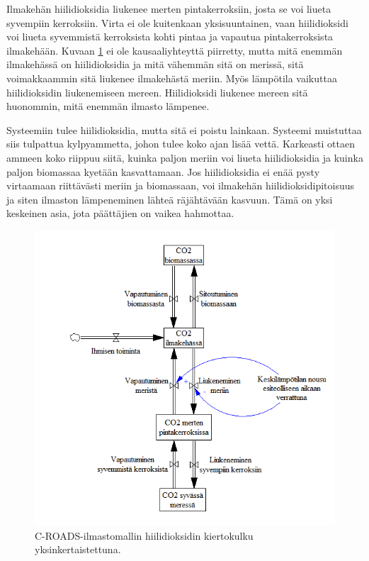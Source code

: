 \documentclass[finnish,12pt,a4paper,pdftex]{article}
\begin{document}
\begin{onehalfspacing}
Ilmakehän hiilidioksidia liukenee merten pintakerroksiin, josta se voi liueta syvempiin kerroksiin. Virta ei ole kuitenkaan yksisuuntainen, vaan hiilidioksidi voi liueta syvemmistä kerroksista kohti pintaa ja vapautua pintakerroksista ilmakehään. Kuvaan \ref{ilmasto:co2} ei ole kausaaliyhteyttä piirretty, mutta mitä enemmän ilmakehässä on hiilidioksidia ja mitä vähemmän sitä on merissä, sitä voimakkaammin sitä liukenee ilmakehästä meriin. Myös lämpötila vaikuttaa hiilidioksidin liukenemiseen mereen. Hiilidioksidi liukenee mereen sitä huonommin, mitä enemmän ilmasto lämpenee.  \cite{Croads, CroadsFlightSimulator2011}

Systeemiin tulee hiilidioksidia, mutta sitä ei poistu lainkaan. Systeemi muistuttaa siis tulpattua kylpyammetta, johon tulee koko ajan lisää vettä. Karkeasti ottaen ammeen koko riippuu siitä, kuinka paljon meriin voi liueta hiilidioksidia ja kuinka paljon biomassaa kyetään kasvattamaan. Jos hiilidioksidia ei enää pysty virtaamaan riittävästi meriin ja biomassaan, voi ilmakehän hiilidioksidipitoisuus ja siten ilmaston lämpeneminen lähteä räjähtävään kasvuun. Tämä on yksi keskeinen asia, jota päättäjien on vaikea hahmottaa. \cite{CroadsFlightSimulator2011}

\begin{figure}[H]
\centering \includegraphics{c-roads-co2}
\caption{C-ROADS-ilmastomallin hiilidioksidin kiertokulku yksinkertaistettuna. \cite{Croads} \label{ilmasto:co2}}
\end{figure}


\end{onehalfspacing}
\end{document}
